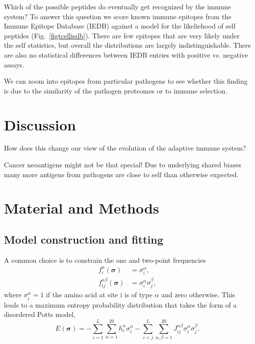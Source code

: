 \documentclass[superscriptaddress,twocolumn,pre]{revtex4}
\newcommand{\B}{\boldsymbol}
\newcommand{\<}{\langle}
\renewcommand{\>}{\rangle}
\begin{document}
Which of the possible peptides do eventually get recognized by the immune system? To answer this question we score known immune epitopes from the Immune Epitope Database (IEDB) against a model for the likeliehood of self peptides (Fig.~\ref{figtcelliedb}). There are few epitopes that are very likely under the self statistics, but overall the distributions are largely indistinguishable. There are also no statistical differences between IEDB entries with positive vs. negative assays.

We can zoom into epitopes from particular pathogens to see whether this finding is due to the similarity of the pathogen proteomes or to immune selection.

\section{Discussion}

How does this change our view of the evolution of the adaptive immune system?

Cancer neoantigens might not be that special! Due to underlying shared biases many more antigens from 
pathogens are close to self than otherwise expected.



\section{Material and Methods}

\subsection{Model construction and fitting}

A common choice is to constrain the one and two-point frequencies
\begin{align}
    f_i^\alpha(\B \sigma) &= \sigma_i^\alpha, \\
    f_{ij}^{\alpha\beta}(\B \sigma) &= \sigma_i^\alpha \sigma_j^\beta,
\end{align}
where $\sigma_i^\alpha = 1$ if the amino acid at site i is of type $\alpha$ and zero otherwise.
This leads to a maximum entropy probability distribution that takes the form of a disordered Potts model,
\begin{equation}
    E(\boldsymbol \sigma) = - \sum_{i=1}^L \sum_{\alpha = 1}^{20} h_i^\alpha \sigma_i^\alpha - \sum_{i<j}^L \sum_{\alpha,\beta = 1}^{20} J_{ij}^{\alpha \beta}  \sigma_i^\alpha \sigma_j^\beta.
\end{equation}
\end{document}
